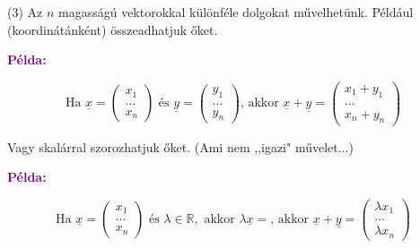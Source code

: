 \documentclass[../szamtud.tex]{subfiles}
\begin{document}
        (3) Az $n$ magasságú vektorokkal különféle dolgokat művelhetünk. Például (koordinátánként) összeadhatjuk őket.

        \textcolor{purple}{\textbf{Példa:}}

        \[
            \textrm{Ha } 
                \underline{x} = 
                    \begin{pmatrix} 
                        x_1 \\ 
                        \dots \\ 
                        x_n 
                    \end{pmatrix} 
            \textrm{ és } 
                \underline{y} = 
                    \begin{pmatrix} 
                        y_1 \\ 
                        \dots \\ 
                        y_n 
                    \end{pmatrix} 
            \textrm{, akkor } 
                \underline{x} + \underline{y} = 
                    \begin{pmatrix} 
                        x_1 + y_1 \\ 
                        \dots \\ 
                        x_n + y_n 
                    \end{pmatrix}
        \]
        
        Vagy skalárral szorozhatjuk őket. (Ami nem ,,igazi" művelet...)
        
        \textcolor{purple}{\textbf{Példa:}}

        \[
            \textrm{Ha } 
                \underline{x} = 
                    \begin{pmatrix} 
                        x_1 \\ 
                        \dots \\ 
                        x_n 
                    \end{pmatrix} 
            \textrm{ és } 
                \lambda \in \mathbb{R}, \textrm{ akkor } \lambda \underline{x} = 
            \textrm{, akkor } 
                \underline{x} + \underline{y} = 
                    \begin{pmatrix} 
                        \lambda x_1\\ 
                        \dots \\ 
                        \lambda x_n 
                    \end{pmatrix}
        \]
\end{document}
